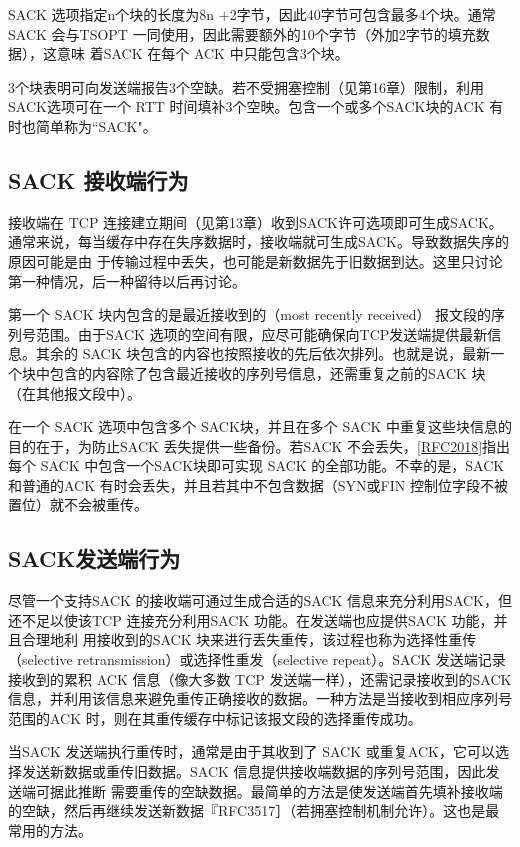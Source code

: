 SACK 选项指定n个块的长度为8n +2字节，因此40字节可包含最多4个块。通常SACK 会与TSOPT
一同使用，因此需要额外的10个字节（外加2字节的填充数据），这意味
着SACK 在每个 ACK 中只能包含3个块。

3个块表明可向发送端报告3个空缺。若不受拥塞控制（见第16章）限制，利用SACK选项可在一个 RTT
时间填补3个空映。包含一个或多个SACK块的ACK 有时也简单称为“SACK"。

\subsection{SACK 接收端行为}
接收端在 TCP
连接建立期间（见第13章）收到SACK许可选项即可生成SACK。通常来说，每当缓存中存在失序数据时，接收端就可生成SACK。导致数据失序的原因可能是由
于传输过程中丢失，也可能是新数据先于旧数据到达。这里只讨论第一种情况，后一种留待以后再讨论。

第一个 SACK 块内包含的是最近接收到的（most recently received） 报文段的序列号范围。由于SACK
选项的空间有限，应尽可能确保向TCP发送端提供最新信息。其余的
SACK 块包含的内容也按照接收的先后依次排列。也就是说，最新一个块中包含的内容除了包含最近接收的序列号信息，还需重复之前的SACK 块（在其他报文段中）。

在一个 SACK 选项中包含多个 SACK块，并且在多个 SACK 中重复这些块信息的目的在于，为防止SACK
丢失提供一些备份。若SACK
不会丢失，\href{https://www.rfc-editor.org/rfc/rfc2018}{[RFC2018]}指出每个 SACK
中包含一个SACK块即可实现 SACK 的全部功能。不幸的是，SACK 和普通的ACK 有时会丢失，并且若其中不包含数据（SYN或FIN
控制位字段不被置位）就不会被重传。

\subsection{SACK发送端行为}
尽管一个支持SACK 的接收端可通过生成合适的SACK 信息来充分利用SACK，但还不足以使该TCP 连接充分利用SACK
功能。在发送端也应提供SACK 功能，并且合理地利
用接收到的SACK 块来进行丢失重传，该过程也称为选择性重传（selective
retransmission）或选择性重发（selective repeat）。SACK 发送端记录接收到的累积 ACK 信息（像大多数 TCP
发送端一样），还需记录接收到的SACK 信息，并利用该信息来避免重传正确接收的数据。一种方法是当接收到相应序列号范围的ACK
时，则在其重传缓存中标记该报文段的选择重传成功。

当SACK 发送端执行重传时，通常是由于其收到了 SACK 或重复ACK，它可以选择发送新数据或重传旧数据。SACK
信息提供接收端数据的序列号范围，因此发送端可据此推断
需要重传的空缺数据。最简单的方法是使发送端首先填补接收端的空缺，然后再继续发送新数据『RFC3517］（若拥塞控制机制允许）。这也是最常用的方法。

